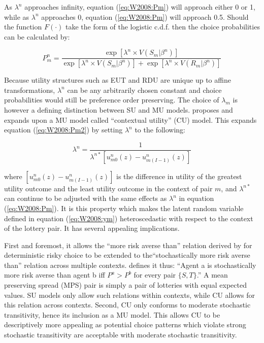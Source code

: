 \documentclass[11pt,a4paper]{report}
\begin{document}
As $\lambda^n$ approaches infinity, equation (\ref{eq:W2008:Pm}) will approach either 0 or 1, while as $\lambda^n$ approaches 0, equation (\ref{eq:W2008:Pm}) will approach 0.5.
Should the function $F(\cdot)$ take the form of the logistic c.d.f. then the choice probabilities can be calculated by:

\begin{equation}
	\label{eq:W2008:Pm2}
	P_m^n = \frac{\exp \left[ \lambda^n \times V(S_m | \beta^n) \right]}{  \exp \left[ \lambda^n \times V(S_m | \beta^n) \right] + \exp \left[ \lambda^n \times V(R_m | \beta^n) \right] }
\end{equation}

Because utility structures such as EUT and RDU are unique up to affine transformations, $\lambda^n$ can be any arbitrarily chosen constant and choice probabilities would still be preference order preserving.
The choice of $\lambda_m$ is however a defining distinction between SU and MU models.
\textcite{Wilcox2008} proposes and \textcite{Wilcox2011} expands upon a MU model called \enquote{contextual utility} (CU) model. This expands equation (\ref{eq:W2008:Pm2}) by setting $\lambda^n$ to the following:

\begin{equation}
	\lambda^n = \frac{1}{\lambda^{n*} \left[ u^n_{m0}(z) - u^n_{m(I-1)}(z) \right]}
\end{equation}

\noindent where $\left[ u^n_{m0}(z) - u^n_{m(I-1)}(z) \right]$ is the difference in utility of the greatest utility outcome and the least utility outcome in the context of pair $m$, and $\lambda^{n*}$ can continue to be adjusted with the same effects as $\lambda^n$ in equation (\ref{eq:W2008:Pm}).
It is this property which makes the latent random variable defined in equation (\ref{eq:W2008:ym}) heteroscedastic with respect to the context of the lottery pair.
It has several appealing implications.

First and foremost, it allows the \enquote{more risk averse than} relation derived by \textcite{Pratt1964} for deterministic risky choice to be extended to the\enquote{stochastically more risk averse than} relation across multiple contexts.
\textcite[89]{Wilcox2011} defines it thus: \enquote{Agent a is stochastically more risk averse than agent b \textelp{} iff $P^a > P^b$ for every  pair $\lbrace S, T \rbrace$.}
A mean preserving spread (MPS) pair is simply a pair of lotteries with equal expected values.
SU models only allow such relations within contexts, while CU allows for this relation across contexts.
Second, CU only conforms to moderate stochastic transitivity, hence its inclusion as a MU model.
This allows CU to be descriptively more appealing as potential choice patterns which violate strong stochastic transitivity are acceptable with moderate stochastic transitivity.
\end{document}
